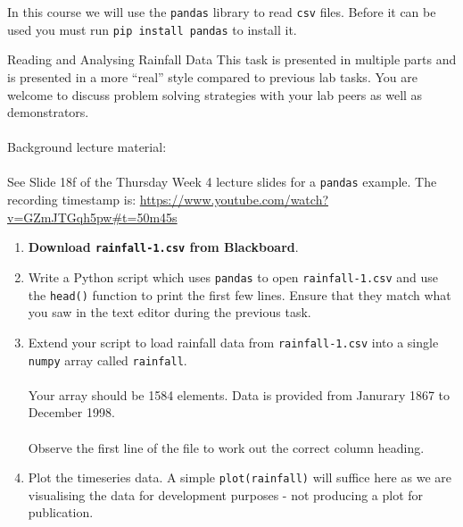 \documentclass{lab}
\begin{document}
In this course we will use the \texttt{pandas} library to read \texttt{csv} files. Before it can be used you must run \texttt{pip install pandas} to install it.

\pagebreak
\begin{task}{Reading and Analysing Rainfall Data}{}
This task is presented in multiple parts and is presented in a more ``real'' style compared to previous lab tasks. You are welcome to discuss problem solving strategies with your lab peers as well as demonstrators.
\\~\\
Background lecture material: \\~\\
See Slide 18f of the Thursday Week 4 lecture slides for a \texttt{pandas} example. The recording timestamp is: \url{https://www.youtube.com/watch?v=GZmJTGqh5pw#t=50m45s}\\
\begin{enumerate}
\item \textbf{Download \texttt{rainfall-1.csv} from Blackboard}.
\item Write a Python script which uses \texttt{pandas} to open \texttt{rainfall-1.csv} and use the \texttt{head()} function to print the first few lines. Ensure that they match what you saw in the text editor during the previous task.
\item Extend your script to load rainfall data from \texttt{rainfall-1.csv} into a single \texttt{numpy} array called \texttt{rainfall}.
\\~\\
Your array should be 1584 elements. Data is provided from Janurary 1867 to December 1998.
\\~\\
Observe the first line of the file to work out the correct column heading.
\item Plot the timeseries data. A simple \texttt{plot(rainfall)} will suffice here as we are visualising the data for development purposes - not producing a plot for publication.


\end{enumerate}
\end{task}
\end{document}
